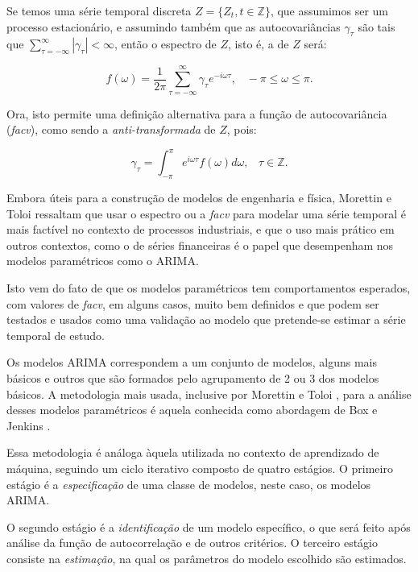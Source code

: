 Se temos uma série temporal discreta $Z = \{ Z_t, t \in \mathbb{Z} \}$, que assumimos ser um processo estacionário, e assumindo também que as autocovariâncias $\gamma_\tau$ são tais que $\sum_{\tau=-\infty}^{\infty} |\gamma_\tau| < \infty$, então o espectro de $Z$, isto é, a  de $Z$ será:

\begin{equation}\label{series:2.33}
f(\omega) = \frac{1}{2\pi} \sum_{\tau=-\infty}^{\infty} \gamma_\tau e^{-i\omega\tau}, \;\;\; -\pi\leq\omega\leq\pi.
\end{equation}

Ora, isto permite uma definição alternativa para a função de autocovariância (\emph{facv}), como sendo a \emph{anti-transformada} de $Z$, pois:

\begin{equation}\label{series:2.34}
\gamma_\tau = \int_{-\pi}^{\pi} e^{i\omega\tau} f(\omega) d\omega, \;\;\; \tau \in \mathbb{Z}.
\end{equation}

Embora úteis para a construção de modelos de engenharia e física, Morettin e Toloi \citep{morettin} ressaltam que usar o espectro ou a \emph{facv} para modelar uma série temporal é mais factível no contexto de processos industriais, e que o uso mais prático em outros contextos, como o de séries financeiras é o papel que desempenham nos modelos paramétricos como o ARIMA.

Isto vem do fato de que os modelos paramétricos tem comportamentos esperados, com valores de \emph{facv}, em alguns casos, muito bem definidos e que podem ser testados e usados como uma validação ao modelo que pretende-se estimar a série temporal de estudo.

Os modelos ARIMA correspondem a um conjunto de modelos, alguns mais básicos e outros que são formados pelo agrupamento de 2 ou 3 dos modelos básicos. A metodologia mais usada, inclusive por Morettin e Toloi \citep{morettin}, para a análise desses modelos paramétricos é aquela conhecida como abordagem de Box e Jenkins \citep{box}.

Essa metodologia é análoga àquela utilizada no contexto de aprendizado de máquina, seguindo um ciclo iterativo composto de quatro estágios. O primeiro estágio é a \emph{especificação} de uma classe de modelos, neste caso, os modelos ARIMA.

O segundo estágio é a \emph{identificação} de um modelo específico, o  que será feito após análise da função de autocorrelação e de outros critérios. O terceiro estágio consiste na \emph{estimação}, na qual os parâmetros do modelo escolhido são estimados.

